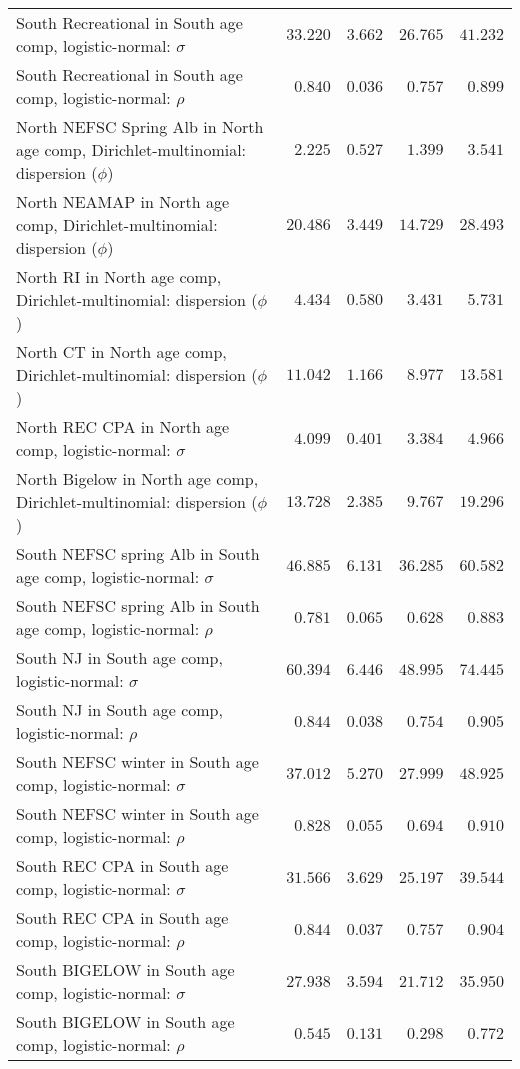 \documentclass[
]{article}
\begin{document}
\begin{landscape}
\begin{longtable}[t]{lrrrr}
South Recreational in South age comp, logistic-normal: $\sigma$ & $33.220$ & $3.662$ & $26.765$ & $41.232$\\
South Recreational in South age comp, logistic-normal: $\rho$ & $0.840$ & $0.036$ & $0.757$ & $0.899$\\
\addlinespace
North NEFSC Spring Alb in North age comp, Dirichlet-multinomial: dispersion ($\phi$) & $2.225$ & $0.527$ & $1.399$ & $3.541$\\
North NEAMAP in North age comp, Dirichlet-multinomial: dispersion ($\phi$) & $20.486$ & $3.449$ & $14.729$ & $28.493$\\
North RI in North age comp, Dirichlet-multinomial: dispersion ($\phi$) & $4.434$ & $0.580$ & $3.431$ & $5.731$\\
North CT in North age comp, Dirichlet-multinomial: dispersion ($\phi$) & $11.042$ & $1.166$ & $8.977$ & $13.581$\\
North REC CPA in North age comp, logistic-normal: $\sigma$ & $4.099$ & $0.401$ & $3.384$ & $4.966$\\
\addlinespace
North Bigelow in North age comp, Dirichlet-multinomial: dispersion ($\phi$) & $13.728$ & $2.385$ & $9.767$ & $19.296$\\
South NEFSC spring Alb in South age comp, logistic-normal: $\sigma$ & $46.885$ & $6.131$ & $36.285$ & $60.582$\\
South NEFSC spring Alb in South age comp, logistic-normal: $\rho$ & $0.781$ & $0.065$ & $0.628$ & $0.883$\\
South NJ in South age comp, logistic-normal: $\sigma$ & $60.394$ & $6.446$ & $48.995$ & $74.445$\\
South NJ in South age comp, logistic-normal: $\rho$ & $0.844$ & $0.038$ & $0.754$ & $0.905$\\
\addlinespace
South NEFSC winter in South age comp, logistic-normal: $\sigma$ & $37.012$ & $5.270$ & $27.999$ & $48.925$\\
South NEFSC winter in South age comp, logistic-normal: $\rho$ & $0.828$ & $0.055$ & $0.694$ & $0.910$\\
South REC CPA in South age comp, logistic-normal: $\sigma$ & $31.566$ & $3.629$ & $25.197$ & $39.544$\\
South REC CPA in South age comp, logistic-normal: $\rho$ & $0.844$ & $0.037$ & $0.757$ & $0.904$\\
South BIGELOW in South age comp, logistic-normal: $\sigma$ & $27.938$ & $3.594$ & $21.712$ & $35.950$\\
\addlinespace
South BIGELOW in South age comp, logistic-normal: $\rho$ & $0.545$ & $0.131$ & $0.298$ & $0.772$\\

\end{longtable}
\end{landscape}
\end{document}
